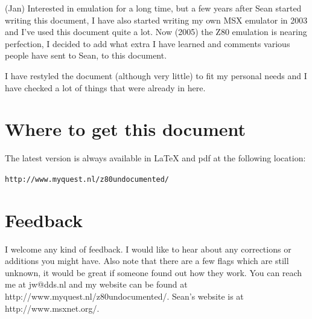 \documentclass[oneside,a4paper]{book}
\begin{document}
(Jan)
Interested in emulation for a long time, but a few years after Sean
started writing this document, I have also started writing my own MSX emulator 
in 2003 and I've used this document quite a lot. Now (2005) the Z80 emulation 
is nearing perfection, I decided to add what extra I have learned and 
comments various people have sent to Sean, to this document.

I have restyled the document (although very little) to fit my personal needs 
and I have checked a lot of things that were already in here.

\section{Where to get this document}

The latest version is always available in {\LaTeX} and pdf at 
the following location:

{\tt http://www.myquest.nl/z80undocumented/}

\section{Feedback}

I welcome any kind of feedback. I would like to hear about any corrections
or additions you might have. Also note that there are a few flags which 
are still unknown, it would be great if someone found out how they work.
You can reach me at {\ttfamily jw@dds.nl} and my website can be 
found at {\ttfamily http://www.myquest.nl/z80undocumented/}.
Sean's website is at {\ttfamily http://www.msxnet.org/}.

\pagebreak
\end{document}
